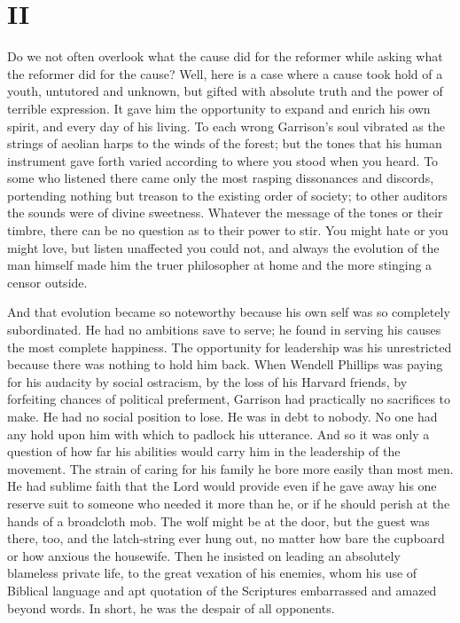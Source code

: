 \documentclass{book}
\begin{document}
\section{II}
Do we not often overlook what the cause did for the reformer while asking what the reformer did for the cause? Well, here is a case where a cause took hold of a youth, untutored and unknown, but gifted with absolute truth and the power of terrible expression. It gave him the opportunity to expand and enrich his own spirit, and every day of his living. To each wrong Garrison’s soul vibrated as the strings of aeolian harps to the winds of the forest; but the tones that his human instrument gave forth varied according to where you stood when you heard. To some who listened there came only the most rasping dissonances and discords, portending nothing but treason to the existing order of society; to other auditors the sounds were of divine sweetness. Whatever the message of the tones or their timbre, there can be no question as to their power to stir. You might hate or you might love, but listen unaffected you could not, and always the evolution of the man himself made him the truer philosopher at home and the more stinging a censor outside.

And that evolution became so noteworthy because his own self was so completely subordinated. He had no ambitions save to serve; he found in serving his causes the most complete happiness. The opportunity for leadership was his unrestricted because there was nothing to hold him back. When Wendell Phillips was paying for his audacity by social ostracism, by the loss of his Harvard friends, by forfeiting chances of political preferment, Garrison had practically no sacrifices to make. He had no social position to lose. He was in debt to nobody. No one had any hold upon him with which to padlock his utterance. And so it was only a question of how far his abilities would carry him in the leadership of the movement. The strain of caring for his family he bore more easily than most men. He had sublime faith that the Lord would provide even if he gave away his one reserve suit to someone who needed it more than he, or if he should perish at the hands of a broadcloth mob. The wolf might be at the door, but the guest was there, too, and the latch-string ever hung out, no matter how bare the cupboard or how anxious the housewife. Then he insisted on leading an absolutely blameless private life, to the great vexation of his enemies, whom his use of Biblical language and apt quotation of the Scriptures embarrassed and amazed beyond words. In short, he was the despair of all opponents.
\end{document}
